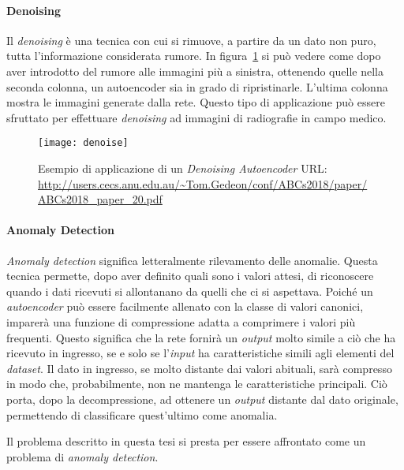 \paragraph{Denoising}
Il \textit{denoising} è una tecnica con cui si rimuove, a partire da un dato non puro, tutta l'informazione considerata rumore.
In figura~\ref{fig:denoise_example} si può vedere come dopo aver introdotto del rumore alle immagini più a sinistra, ottenendo quelle nella seconda colonna, un autoencoder sia in grado di ripristinarle.
L'ultima colonna mostra le immagini generate dalla rete.
Questo tipo di applicazione può essere sfruttato per effettuare \textit{denoising} ad immagini di radiografie in campo medico.
\begin{figure}[ht]
  \begin{center}
    \texttt{[image: denoise]}
  \end{center}
  \caption{Esempio di applicazione di un \textit{Denoising Autoencoder} URL: \url{http://users.cecs.anu.edu.au/~Tom.Gedeon/conf/ABCs2018/paper/ABCs2018_paper_20.pdf}}
  \label{fig:denoise_example}
\end{figure}


\paragraph{Anomaly Detection}
\textit{Anomaly detection} significa letteralmente rilevamento delle anomalie.
Questa tecnica permette, dopo aver definito quali sono i valori attesi, di riconoscere quando i dati ricevuti si allontanano da quelli che ci si aspettava.
Poiché un \textit{autoencoder} può essere facilmente allenato con la classe di valori canonici, imparerà una funzione di compressione adatta a comprimere i valori più frequenti.
Questo significa che la rete fornirà un \textit{output} molto simile a ciò che ha ricevuto in ingresso, se e solo se l'\textit{input} ha caratteristiche simili agli elementi del \textit{dataset}.
Il dato in ingresso, se molto distante dai valori abituali, sarà compresso in modo che, probabilmente, non ne mantenga le caratteristiche principali.
Ciò porta, dopo la decompressione, ad ottenere un \textit{output} distante dal dato originale, permettendo di classificare quest'ultimo come anomalia.

Il problema descritto in questa tesi si presta per essere affrontato come un problema di \textit{anomaly detection}.






